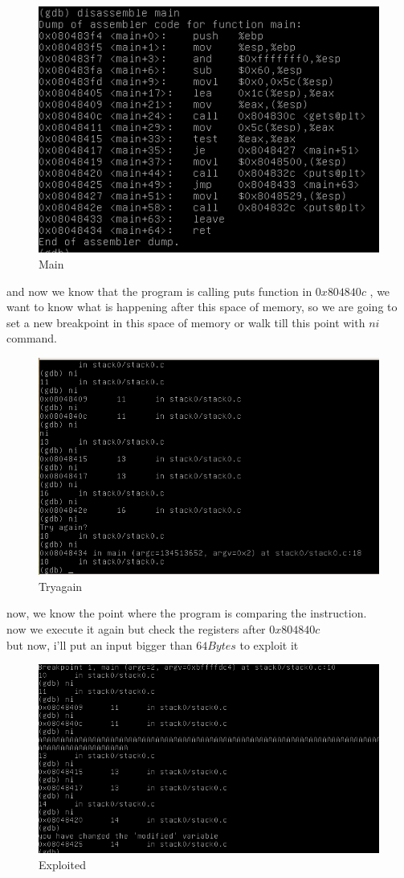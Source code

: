 \documentclass[10pt,a4paper]{article} %
\begin{document}
                \begin{figure}[h!]
                    \centering
                    \includegraphics[width=0.4\linewidth]{protomain.png}
                    \caption{Main}
                    \label{fig:protomain}
                \end{figure}
                and now we know that the program is calling puts function in $
                0x804840c  $  , we want to know what is happening after this space
                of memory, so we are going to set a new breakpoint in this space of
                memory  or walk till this point with $ ni  $ command.
                \\
                \begin{figure}[h!]
                    \centering
                    \includegraphics[width=0.4\linewidth]{tryagain.png}
                    \caption{Tryagain}
                    \label{fig:tryagain}
                \end{figure}
                now, we know the point where the program is comparing the instruction.
                \\ now we execute it again but check the registers after $ 0x804840c  $
                \\
                but now, i'll put an input bigger than $ 64Bytes  $ to exploit it
                \begin{figure}[h!]
                    \centering
                    \includegraphics[width=0.5\linewidth]{exploited.png}
                    \caption{Exploited}
                    \label{fig:exploited}
                \end{figure}
\end{document}
